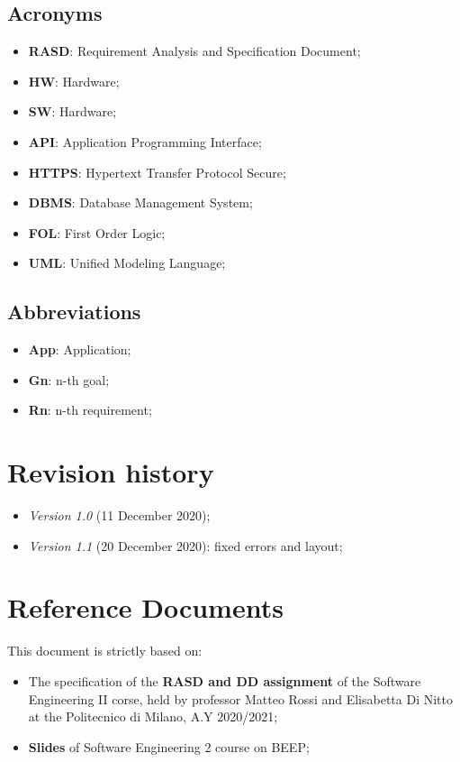 \subsection{Acronyms}
\begin{itemize}
\item \textbf{RASD}: Requirement Analysis and Specification Document;
\item \textbf{HW}: Hardware;
\item \textbf{SW}: Hardware;
\item \textbf{API}: Application Programming Interface;
\item \textbf{HTTPS}: Hypertext Transfer Protocol Secure;
\item \textbf{DBMS}: Database Management System;
\item \textbf{FOL}: First Order Logic;
\item \textbf{UML}: Unified Modeling Language;
\end{itemize}
\medskip
\subsection{Abbreviations}
\begin{itemize}
\item \textbf{App}: Application;
\item \textbf{Gn}: n-th goal;
\item \textbf{Rn}: n-th requirement;
\end{itemize}



\section{Revision history}
\begin{itemize}
\item \textit{Version 1.0} (11 December 2020);
\item \textit{Version 1.1} (20 December 2020): fixed errors and layout; 
\end{itemize}

\pagebreak
\section{Reference Documents}
This document is strictly based on:
\begin{itemize}
\item The specification of the \textbf{RASD and DD assignment} of the Software Engineering II corse, held by professor Matteo Rossi and Elisabetta Di Nitto at the Politecnico di Milano, A.Y 2020/2021;
\item \textbf{Slides} of Software Engineering 2 course on BEEP;
\end{itemize}
